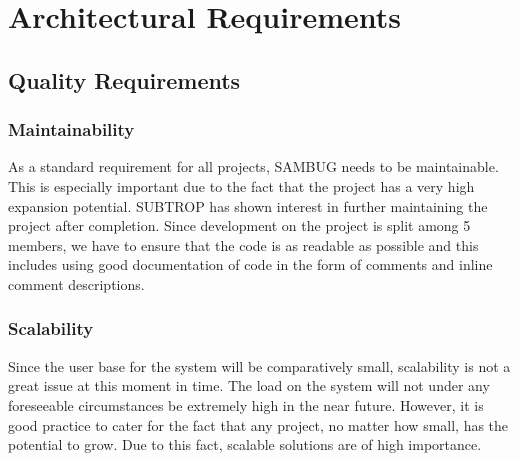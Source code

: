 \documentclass[11pt,a4paper,titlepage]{article}
\begin{document}
	
    


\tableofcontents

\pagebreak


\pagebreak


		
		
\section{Architectural Requirements}
	\subsection{Quality Requirements}
		\subsubsection{Maintainability}
			As a standard requirement for all projects, SAMBUG needs to be maintainable. This is especially important due to the fact that the project has a very high expansion potential. SUBTROP has shown interest in further maintaining the project after completion.
			Since development on the project is split among 5 members, we have to ensure that the code is as readable as possible and this includes using good documentation of code in the form of comments and inline comment descriptions.
		\subsubsection{Scalability}
			Since the user base for the system will be comparatively small, scalability is not a great issue at this moment in time. The load on the system will not under any foreseeable circumstances be extremely high in the near future. However, it is good practice to cater for the fact that any project, no matter how small, has the potential to grow. Due to this fact, scalable solutions are of high importance. 
\end{document}
